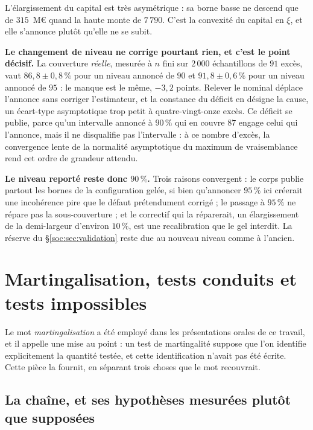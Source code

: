 \vspace{4pt}
\noindent L'élargissement du capital est très asymétrique : sa borne basse ne descend que de
$315$~M\euro{} quand la haute monte de $7\,790$. C'est la convexité du capital en $\xi$, et elle
s'annonce plutôt qu'elle ne se subit.

\textbf{Le changement de niveau ne corrige pourtant rien, et c'est le point décisif.} La couverture
\emph{réelle}, mesurée à $n$ fini sur $2\,000$ échantillons de $91$ excès, vaut
$86{,}8 \pm 0{,}8\,\%$ pour un niveau annoncé de $90$ et $91{,}8 \pm 0{,}6\,\%$ pour un niveau
annoncé de $95$ : le manque est le même, $-3{,}2$ points. Relever le nominal déplace l'annonce sans
corriger l'estimateur, et la constance du déficit en désigne la cause, un écart-type asymptotique
trop petit à quatre-vingt-onze excès. Ce déficit se publie, parce qu'un intervalle annoncé à
$90\,\%$ qui en couvre $87$ engage celui qui l'annonce, mais il ne disqualifie pas l'intervalle :
à ce nombre d'excès, la convergence lente de la normalité asymptotique du maximum de vraisemblance
rend cet ordre de grandeur attendu.

\textbf{Le niveau reporté reste donc $90\,\%$.} Trois raisons convergent : le corps publie partout
les bornes de la configuration gelée, si bien qu'annoncer $95\,\%$ ici créerait une incohérence
pire que le défaut prétendument corrigé ; le passage à $95\,\%$ ne répare pas la sous-couverture ;
et le correctif qui la réparerait, un élargissement de la demi-largeur d'environ $10\,\%$, est une
recalibration que le gel interdit. La réserve du \S\ref{soc:sec:validation} reste due au nouveau
niveau comme à l'ancien.

\section{Martingalisation, tests conduits et tests impossibles}
\label{sec:ann-martingalisation}


Le mot \emph{martingalisation} a été employé dans les présentations orales de ce travail, et il
appelle une mise au point : un test de martingalité suppose que l'on identifie explicitement la
quantité testée, et cette identification n'avait pas été écrite. Cette pièce la fournit, en
séparant trois choses que le mot recouvrait.

\subsection*{La chaîne, et ses hypothèses mesurées plutôt que supposées}

